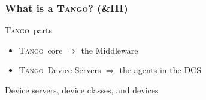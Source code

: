 \documentclass{beamer}
\newcommand{\tango}{\textsc{Tango}}
\begin{document}
\begin{frame}
\frametitle{What is a \tango? (\&III)}
    \begin{block}{\tango\, parts}
        \begin{itemize}
            \item \tango\, core $\Rightarrow$ the Middleware
            \item \tango\, Device Servers $\Rightarrow$ the agents in the DCS
        \end{itemize}
    \end{block}
    \begin{exampleblock}{Device servers, device classes, and devices}
        \begin{figure}[h]
        \end{figure}
    \end{exampleblock}
\end{frame}
\end{document}
